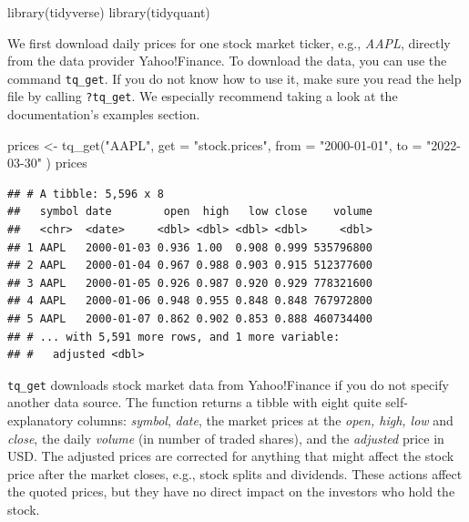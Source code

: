 \documentclass[
]{krantz}
\newenvironment{Shaded}{\begin{snugshade}}{\end{snugshade}}
\newcommand{\AttributeTok}[1]{\textcolor[rgb]{0.61,0.61,0.61}{#1}}
\newcommand{\FunctionTok}[1]{\textcolor[rgb]{0,0,0}{#1}}
\newcommand{\NormalTok}[1]{#1}
\newcommand{\OtherTok}[1]{\textcolor[rgb]{0.37,0.37,0.37}{#1}}
\newcommand{\StringTok}[1]{\textcolor[rgb]{0.5,0.5,0.5}{#1}}
\begin{document}
\begin{Shaded}
\begin{Highlighting}[]
\FunctionTok{library}\NormalTok{(tidyverse)}
\FunctionTok{library}\NormalTok{(tidyquant)}
\end{Highlighting}
\end{Shaded}

We first download daily prices for one stock market ticker, e.g., \emph{AAPL}, directly from the data provider Yahoo!Finance.
To download the data, you can use the command \texttt{tq\_get}. If you do not know how to use it, make sure you read the help file by calling \texttt{?tq\_get}.
We especially recommend taking a look at the documentation's examples section.

\begin{Shaded}
\begin{Highlighting}[]
\NormalTok{prices }\OtherTok{\textless{}{-}} \FunctionTok{tq\_get}\NormalTok{(}\StringTok{"AAPL"}\NormalTok{,}
  \AttributeTok{get =} \StringTok{"stock.prices"}\NormalTok{,}
  \AttributeTok{from =} \StringTok{"2000{-}01{-}01"}\NormalTok{,}
  \AttributeTok{to =} \StringTok{"2022{-}03{-}30"}
\NormalTok{)}
\NormalTok{prices}
\end{Highlighting}
\end{Shaded}

\begin{verbatim}
## # A tibble: 5,596 x 8
##   symbol date        open  high   low close    volume
##   <chr>  <date>     <dbl> <dbl> <dbl> <dbl>     <dbl>
## 1 AAPL   2000-01-03 0.936 1.00  0.908 0.999 535796800
## 2 AAPL   2000-01-04 0.967 0.988 0.903 0.915 512377600
## 3 AAPL   2000-01-05 0.926 0.987 0.920 0.929 778321600
## 4 AAPL   2000-01-06 0.948 0.955 0.848 0.848 767972800
## 5 AAPL   2000-01-07 0.862 0.902 0.853 0.888 460734400
## # ... with 5,591 more rows, and 1 more variable:
## #   adjusted <dbl>
\end{verbatim}

\texttt{tq\_get} downloads stock market data from Yahoo!Finance if you do not specify another data source. The function returns a tibble with eight quite self-explanatory columns: \emph{symbol}, \emph{date}, the market prices at the \emph{open, high, low} and \emph{close}, the daily \emph{volume} (in number of traded shares), and the \emph{adjusted} price in USD. The adjusted prices are corrected for anything that might affect the stock price after the market closes, e.g., stock splits and dividends. These actions affect the quoted prices, but they have no direct impact on the investors who hold the stock.
\end{document}
